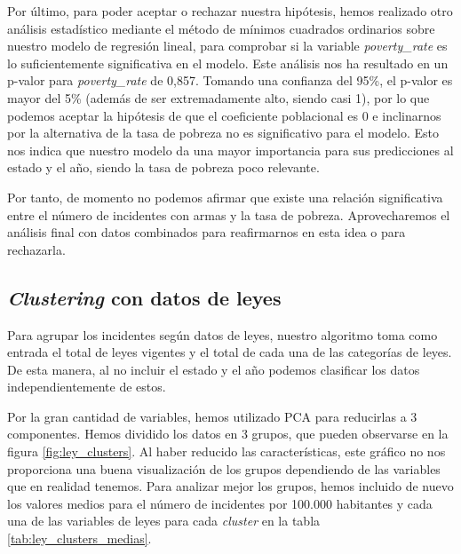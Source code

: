 \documentclass[11pt,a4paper]{article}
\begin{document}
Por último, para poder aceptar o rechazar nuestra hipótesis, hemos realizado otro análisis estadístico mediante el método de mínimos cuadrados ordinarios sobre nuestro modelo de regresión lineal, para comprobar si la variable \textit{poverty\_rate} es lo suficientemente significativa en el modelo. Este análisis nos ha resultado en un p-valor para \textit{poverty\_rate} de 0,857. Tomando una confianza del 95\%, el p-valor es mayor del 5\% (además de ser extremadamente alto, siendo casi 1), por lo que podemos aceptar la hipótesis de que el coeficiente poblacional es 0 e inclinarnos por la alternativa de la tasa de pobreza no es significativo para el modelo. Esto nos indica que nuestro modelo da una mayor importancia para sus predicciones al estado y el año, siendo la tasa de pobreza poco relevante.

Por tanto, de momento no podemos afirmar que existe una relación significativa entre el número de incidentes con armas y la tasa de pobreza. Aprovecharemos el análisis final con datos combinados para reafirmarnos en esta idea o para rechazarla.

\subsection{\textit{Clustering} con datos de leyes}

Para agrupar los incidentes según datos de leyes, nuestro algoritmo toma como entrada el total de leyes vigentes y el total de cada una de las categorías de leyes. De esta manera, al no incluir el estado y el año podemos clasificar los datos independientemente de estos.

Por la gran cantidad de variables, hemos utilizado PCA para reducirlas a 3 componentes. Hemos dividido los datos en 3 grupos, que pueden observarse en la figura \ref{fig:ley_clusters}. Al haber reducido las características, este gráfico no nos proporciona una buena visualización de los grupos dependiendo de las variables que en realidad tenemos. Para analizar mejor los grupos, hemos incluido de nuevo los valores medios para el número de incidentes por 100.000 habitantes y cada una de las variables de leyes para cada \textit{cluster} en la tabla \ref{tab:ley_clusters_medias}.
\end{document}
